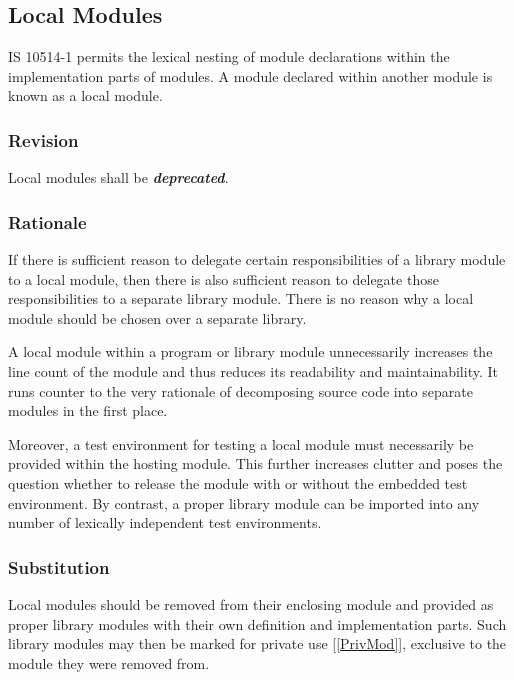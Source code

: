 \documentclass[10pt,a4paper,leqno,fleqn]{article}
\renewcommand{\emph}[1]{\textbf{\textit{#1}}}
\begin{document}
\subsection{Local Modules}

IS 10514-1 permits the lexical nesting of module declarations within the
implementation parts of modules. A module declared within another module
is known as a local module.

\subsubsection{Revision}

Local modules shall be \emph{deprecated}.

\subsubsection{Rationale}
If there is sufficient reason to delegate certain responsibilities of a library
module to a local module, then there is also sufficient reason to delegate
those responsibilities to a separate library module. There is no reason why a
local module should be chosen over a separate library.

A local module within a program or library module unnecessarily increases
the line count of the module and thus reduces its readability and maintainability.
It runs counter to the very rationale of decomposing source
code into separate modules in the first place.

Moreover, a test environment for testing a local module must necessarily be
provided within the hosting module.  This further increases clutter and poses
the question whether to release the module with or without the embedded test
environment. By contrast, a proper library module can be imported into any
number of lexically independent test environments.

\subsubsection{Substitution}
Local modules should be removed from their enclosing module and provided as
proper library modules with their own definition and implementation parts. Such
library modules may then be marked for private use [\ref{PrivMod}], exclusive to
the module they were removed from.
\end{document}
